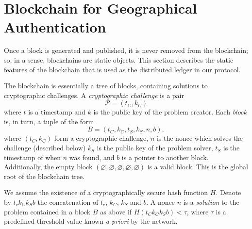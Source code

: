 \section{Blockchain for Geographical Authentication}

Once a block is generated and published,
it is never removed from the blockchain;
so, in a sense,
blockchains are static objects.
This section describes the static features of the blockchain
that is used as the distributed ledger in our protocol.

The blockchain is essentially a tree of blocks,
containing solutions to cryptographic challenges.
A \emph{cryptographic challenge} is a pair
\begin{equation*}
	\mathcal P = (t_C, k_C)
\end{equation*}
where $t$ is a timestamp and $k$ is the public key of the problem creator.
Each \emph{block} is, in turn, a tuple of the form
\begin{equation*}
	B = (t_C, k_C, t_S, k_S, n, b),
\end{equation*}
where $(t_C, k_C)$ form a cryptographic challenge,
$n$ is the nonce which solves the challenge (described below)
$k_S$ is the public key of the problem solver,
$t_S$ is the timestamp of when $n$ was found,
and $b$ is a pointer to another block.
Additionally,
the empty block $(\varnothing, \varnothing, \varnothing, \varnothing, \varnothing)$
is a valid block.
This is the global root of the blockchain tree.

We assume the existence of a cryptographically secure hash function $H$.
Denote by $t_c k_C k_S b$ the concatenation of $t_c$, $k_C$, $k_S$ and $b$.
A nonce $n$ is a \emph{solution} to the problem contained in a block $B$ as above
if $H(t_C k_C k_S b) < \tau$,
where $\tau$ is a predefined threshold value known \emph{a priori} by the network.

